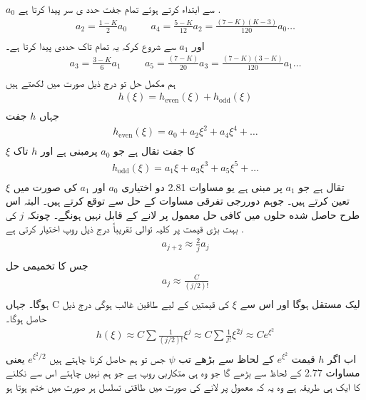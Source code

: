 \documentclass{book}
\begin{document}
\(a_{0}\)
سے ابتداء کرتے ہوئے تمام جفت حدد ی سر پیدا کرتا ہے .
\begin{align*}
a_{2}=\frac{1-K}{2}a_{0} \hspace{1cm} a_{4}=\frac{5-K}{12}a_{2}=\frac{(7-K)(K-3)}{120}a_{0}\dotsc\\
\end{align*}
اور
\(a_{1}\)
سے شروع کرکہ یہ تمام تاک حددی پیدا کرتا ہے۔
\begin{align*}
a_{3}=\frac{3-K}{6}a_{1}\hspace{1cm}a_{5}=\frac{(7-K)}{20}a_{3}=\frac{(7-K)(3-K)}{120}a_{1}\dotsc\\
\end{align*}
ہم مکمل حل تو درج ذیل صورت میں لکھتے ہیں
\begin{align*}
h(\xi)=h_{\text{even}}(\xi)+h_{\text{odd}}(\xi)\\
\end{align*}
جہاں
\(h\)
جفت
\begin{align*}
h_{\text{even}}(\xi)=a_{0}+a_{2}\xi^{2}+a_{4}\xi^{4}+\dotsc\\
\end{align*}
\(\xi\)
کا جفت تقال ہے جو
\(a_{0}\)
پرمبنی ہے اور
\(h\)
تاک
\begin{align*}
h_{\text{odd}}(\xi)=a_{1}\xi+a_{3}\xi^{3}+a_{5}\xi^{5}+\dotsc\\
\end{align*}
تقال ہے جو
\(a_{1}\)
پر مبنی ہے یو مساوات 2.81 دو اختیاری
\(a_{0}\)
اور
\(a_{1}\)
کی صورت میں
\(\xi\)
تعین کرتے ہیں۔ جوہم دوررجی تفرقی مساوات کے حل سے توقع کرتے ہیں۔ البتہ اس طرح حاصل شده حلوں میں کافی حل معمول پر لانے کے قابل نہیں ہونگے۔ چونکہ
\(j\)
کی بہت بڑی قیمت پر کلیہ توالی تقریباً درج ذیل روپ اختیار کرتی ہے .
\begin{align*}
a_{j+2}\approx\frac{2}{j}a_{j}\\
\end{align*}
جس کا تخمیمی حل
\begin{align*}
a_{j}\approx\frac{C}{(j/2)!}\\
\end{align*}
ہوگا۔ جہاں
C
لیک مستقل ہوگا اور اس سے
\(\xi\)
کی قیمتیں کے لیے طاقین غالب ہوگی درج ذیل حاصل ہوگا۔
\begin{align*}
h(\xi)\approx C\sum\frac{1}{(j/2)!}\xi^{j}\approx C\sum\frac{1}{j!}\xi^{2j}\approx Ce^{\xi^{2}}\\
\end{align*}
اب اگر
\(h\)
قیمت
\(e^{\xi^{2}}\)
کے لحاظ سے بڑھے تب
\(\psi\)
جس تو ہم حاصل کرنا چاہتے ہیں
\(e^{\xi^{2}/2}\)
یعنی مساوات 2.77
کے لحاظ سے بڑھے گا جو وہ ہی متکاربی روپ ہے جو ہم نہیں چاہتے اس سے نکلنے کا ایک ہی طریقہ ہے وہ یہ کہ معمول پر لانے کی صورت میں طاقتی تسلسل ہر صورت میں ختم ہوتا ہو
\end{document}
